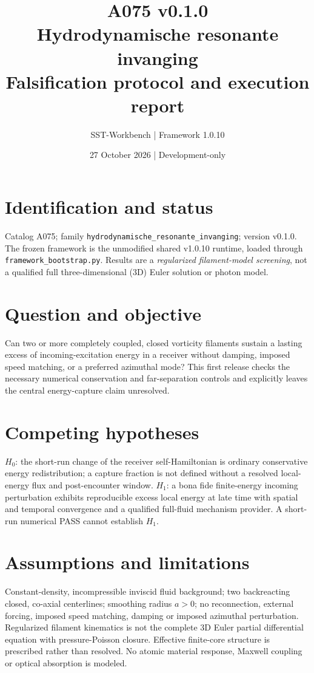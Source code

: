 \documentclass[11pt,a4paper]{article}
\title{A075 v0.1.0\\Hydrodynamische resonante invanging\\\large Falsification protocol and execution report}
\author{SST-Workbench | Framework 1.0.10}
\date{27 October 2026 | Development-only}
\begin{document}
\maketitle
\section{Identification and status}
Catalog A075; family \texttt{hydrodynamische\_resonante\_invanging}; version v0.1.0. The frozen framework is the unmodified shared v1.0.10 runtime, loaded through \texttt{framework\_bootstrap.py}. Results are a \emph{regularized filament-model screening}, not a qualified full three-dimensional (3D) Euler solution or photon model.
\section{Question and objective}
Can two or more completely coupled, closed vorticity filaments sustain a lasting excess of incoming-excitation energy in a receiver without damping, imposed speed matching, or a preferred azimuthal mode? This first release checks the necessary numerical conservation and far-separation controls and explicitly leaves the central energy-capture claim unresolved.
\section{Competing hypotheses}
$H_0$: the short-run change of the receiver self-Hamiltonian is ordinary conservative energy redistribution; a capture fraction is not defined without a resolved local-energy flux and post-encounter window. $H_1$: a bona fide finite-energy incoming perturbation exhibits reproducible excess local energy at late time with spatial and temporal convergence and a qualified full-fluid mechanism provider. A short-run numerical PASS cannot establish $H_1$.
\section{Assumptions and limitations}
Constant-density, incompressible inviscid fluid background; two backreacting closed, co-axial centerlines; smoothing radius $a>0$; no reconnection, external forcing, imposed speed matching, damping or imposed azimuthal perturbation. Regularized filament kinematics is not the complete 3D Euler partial differential equation with pressure-Poisson closure. Effective finite-core structure is prescribed rather than resolved. No atomic material response, Maxwell coupling or optical absorption is modeled.
\end{document}
